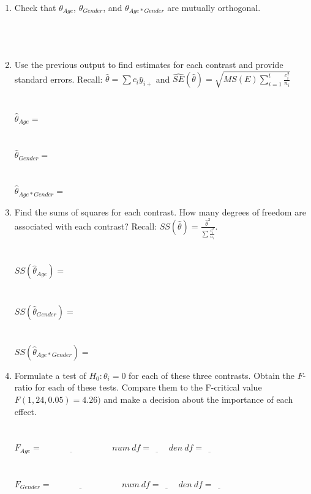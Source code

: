 \begin{enumerate}
\item Check that $\theta_{Age}$, $\theta_{Gender}$, and $\theta_{Age*Gender}$ are mutually orthogonal.  \\~\\~\\~\\
\item Use the previous output to find estimates for each contrast and provide standard errors.  Recall: $\hat\theta=\sum c_i \bar{y}_{i+}$ and $\hat{SE}(\hat{\theta})=\sqrt{MS(E)\sum_{i=1}^{t}\frac{c_i^2}{n_i}}$\\~\\~\\
$\hat{\theta}_{Age} = $\\~\\~\\
$\hat{\theta}_{Gender} = $\\~\\~\\
$\hat{\theta}_{Age*Gender} = $\\
\item Find the sums of squares for each contrast.  How many degrees of freedom are associated with each contrast?   Recall: $ SS(\hat\theta) = \frac{\hat\theta^2}{\sum \frac{c_i^2}{n_i}}.$\\~\\~\\
$SS(\hat{\theta}_{Age}) = $\\~\\~\\
$SS(\hat{\theta}_{Gender}) = $\\~\\~\\
$SS(\hat{\theta}_{Age*Gender}) = $\\
\item Formulate a test of $H_0:\theta_i=0$ for each of these three contrasts.  Obtain the $F$-ratio for each of these tests. Compare them to the F-critical value $F(1,24,0.05)=4.26)$ and make a decision about the importance of each effect.\\~\\~\\
$F_{Age}=\underbar{~~~~~~~~~~~~~~~~~~~~~~~~~~~~~~~~}~~~~~num~df=\underbar{~~~~~~~}~~den~df=\underbar{~~~~~~~}$\\~\\~\\
$F_{Gender}=\underbar{~~~~~~~~~~~~~~~~~~~~~~~~~~~~~~~~}~~~~~num~df=\underbar{~~~~~~~}~~den~df=\underbar{~~~~~~~}$\\~\\~\\

\end{enumerate}
